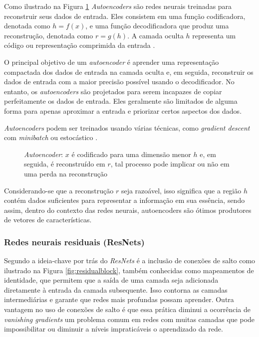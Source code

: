 \documentclass[a4paper,12pt,openright,oneside]{book}
\newenvironment{myenv}[1]
  {\begin{spacing}{#1}}
  {\end{spacing}}
\begin{document}
\begin{myenv}{1.5}
					\par Como ilustrado na Figura \ref{fig:autoencoder} \textit{Autoencoders} são redes neurais treinadas para reconstruir seus dados de entrada. Eles consistem em uma função codificadora, denotada como $h = f(x)$, e uma função decodificadora que produz uma reconstrução, denotada como $r = g(h)$. A camada oculta $h$ representa um código ou representação comprimida da entrada \cite{Goodfellow-et-al-2016}. \newline
					
					\par O principal objetivo de um \textit{autoencoder} é aprender uma representação compactada dos dados de entrada na camada oculta e, em seguida, reconstruir os dados de entrada com a maior precisão possível usando o decodificador. No entanto, os \textit{autoencoders} são projetados para serem incapazes de copiar perfeitamente os dados de entrada. Eles geralmente são limitados de alguma forma para apenas aproximar a entrada e priorizar certos aspectos dos dados. \newline
					
					\par \textit{Autoencoders} podem ser treinados usando várias técnicas, como \textit{gradient descent} com \textit{minibatch} ou estocástico \cite{Goodfellow-et-al-2016}.
					
					\begin{figure}[h]
						\centering
						\caption[autoencoder]{\textit{Autoencoder}: $x$ é codificado para uma dimensão menor $h$ e, em seguida, é reconstruído em $r$, tal processo pode implicar ou não em uma perda na reconstrução}
						
						\label{fig:autoencoder}
					\end{figure}
				
					\par Considerando-se que a reconstrução $r$ seja razoável, isso significa que a região $h$  contém dados suficientes para representar a informação em sua essência, sendo assim, dentro do contexto das redes neurais, autoencoders são ótimos produtores de vetores de características.
					
					\subsubsection{Redes neurais residuais (ResNets)}
						\par Segundo \cite{DBLP:journals/corr/HeZRS15} a ideia-chave por trás do \textit{ResNets} é a inclusão de conexões de salto como ilustrado na Figura \ref{fig:residualblock}, também conhecidas como mapeamentos de identidade, que permitem que a saída de uma camada seja adicionada diretamente à entrada da camada subsequente. Isso contorna as camadas intermediárias e garante que redes mais profundas possam aprender. Outra vantagem no uso de conexões de salto é que essa prática diminui a ocorrência de \textit{vanishing gradients} um problema comum em redes com muitas camadas que pode impossibilitar ou diminuir a níveis impraticáveis o aprendizado da rede.
						

\end{myenv}
\end{document}
